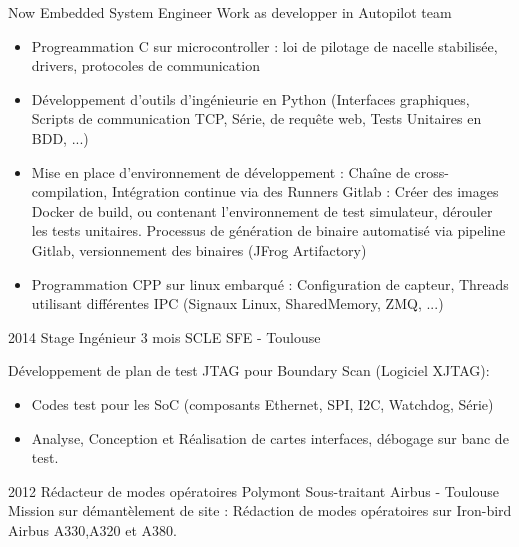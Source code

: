 \documentclass[a4paper]{friggeri-cv} %
\begin{document}
\begin{entrylist}
\entry
{Now}
{Embedded System Engineer}
{Work as developper in Autopilot team}
{
\begin{itemize}
\item Progreammation C sur microcontroller : loi de pilotage de nacelle
	stabilisée, drivers, protocoles de communication
\item Développement d'outils d'ingénieurie en Python (Interfaces graphiques,
	Scripts de communication TCP, Série, de requête web, Tests Unitaires en
		BDD, ...)
\item Mise en place d'environnement de développement : Chaîne
	de cross-compilation, Intégration continue via des Runners Gitlab :
	Créer des images Docker de build, ou contenant l'environnement de test
	simulateur, dérouler les tests unitaires. Processus de génération de
	binaire automatisé via pipeline Gitlab, versionnement des binaires
	(JFrog Artifactory)
\item Programmation CPP sur linux embarqué : Configuration de capteur, Threads
	utilisant différentes IPC (Signaux Linux, SharedMemory, ZMQ, ...)
\end{itemize}}
\entry
{2014}
{Stage Ingénieur 3 mois}
{SCLE SFE - Toulouse}
{Développement de plan de test JTAG pour Boundary Scan (Logiciel XJTAG):\smallskip
\begin{itemize}
\item Codes test pour les SoC (composants Ethernet, SPI, I2C, Watchdog, Série)
\item Analyse, Conception et Réalisation de cartes interfaces, débogage sur banc de test.
\end{itemize}}


\entry
{2012}
{Rédacteur de modes opératoires}
{Polymont Sous-traitant Airbus - Toulouse}
{Mission sur démantèlement de site : Rédaction de modes opératoires sur Iron-bird Airbus A330,A320 et A380.}




\end{entrylist}


\end{document}
